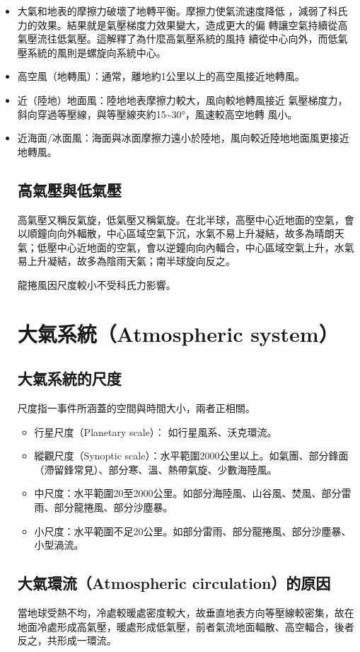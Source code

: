 \documentclass[a4paper,12pt]{report}
\begin{document}
\begin{itemize}
  \item 大氣和地表的摩擦力破壞了地轉平衡。摩擦力使氣流速度降低 ，減弱了科氏力的效果。結果就是氣壓梯度力效果變大，造成更大的偏 轉讓空氣持續從高氣壓流往低氣壓。這解釋了為什麼高氣壓系統的風持 續從中心向外，而低氣壓系統的風則是螺旋向系統中心。
  \item 高空風（地轉風）：通常，離地約1公里以上的高空風接近地轉風。
  \item 近（陸地）地面風：陸地地表摩擦力較大，風向較地轉風接近 氣壓梯度力，斜向穿過等壓線，與等壓線夾約15\sim 30°，風速較高空地轉 風小。
  \item 近海面/冰面風：海面與冰面摩擦力遠小於陸地，風向較近陸地地面風更接近地轉風。
  \eit
\subsection{高氣壓與低氣壓}
高氣壓又稱反氣旋，低氣壓又稱氣旋。在北半球，高壓中心近地面的空氣，會以順鐘向向外輻散，中心區域空氣下沉，水氣不易上升凝結，故多為晴朗天氣；低壓中心近地面的空氣，會以逆鐘向向內輻合，中心區域空氣上升，水氣易上升凝結，故多為陰雨天氣；南半球旋向反之。

龍捲風因尺度較小不受科氏力影響。
\section{大氣系統（Atmospheric system）}
\subsection{大氣系統的尺度}
尺度指一事件所涵蓋的空間與時間大小，兩者正相關。
\begin{itemize}
\item 行星尺度（Planetary scale）： 如行星風系、沃克環流。
\item 縱觀尺度（Synoptic scale）：水平範圍2000公里以上。如氣團、部分鋒面（滯留鋒常見）、部分寒、溫、熱帶氣旋、少數海陸風。
\item 中尺度：水平範圍20至2000公里。如部分海陸風、山谷風、焚風、部分雷雨、部分龍捲風、部分沙塵暴。
\item 小尺度：水平範圍不足20公里。如部分雷雨、部分龍捲風、部分沙塵暴、小型渦流。
\end{itemize}
\subsection{大氣環流（Atmospheric circulation）的原因}
當地球受熱不均，冷處較暖處密度較大，故垂直地表方向等壓線較密集，故在地面冷處形成高氣壓，暖處形成低氣壓，前者氣流地面輻散、高空輻合，後者反之，共形成一環流。

\end{itemize}
\end{document}

